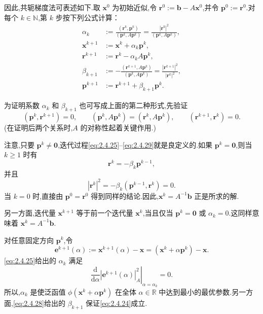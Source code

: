 因此,共轭梯度法可表述如下.取 \(\boldsymbol{x}^0\) 为初始近似,令 \(\boldsymbol{r}^0:=\boldsymbol{b}-A\boldsymbol{x}^0\),并令 \(\boldsymbol{p}^0:=\boldsymbol{r}^0\).对每个 \(k\in\mathbb N\),第 \(k\) 步按下列公式计算：
\begin{align}
  \alpha_k&:=\frac{(\boldsymbol{r}^k,\boldsymbol{p}^k)}{(\boldsymbol{p}^k,A\boldsymbol{p}^k)}
             =\frac{|\boldsymbol{r}^k|^2}{(\boldsymbol{p}^k,A\boldsymbol{p}^k)},\label{eq:2.4.25}\\
  \boldsymbol{x}^{k+1}&:=\boldsymbol{x}^k+\alpha_k\boldsymbol{p}^k,\label{eq:2.4.26}\\
  \boldsymbol{r}^{k+1}&:=\boldsymbol{r}^k-\alpha_kA\boldsymbol{p}^k,\label{eq:2.4.27}\\
  \beta_{k+1}&:=-\frac{(\boldsymbol{r}^{k+1},A\boldsymbol{p}^k)}{(\boldsymbol{p}^k,A\boldsymbol{p}^k)}
               =\frac{|\boldsymbol{r}^{k+1}|^2}{|\boldsymbol{r}^k|^2},\label{eq:2.4.28}\\
  \boldsymbol{p}^{k+1}&:=\boldsymbol{r}^{k+1}+\beta_{k+1}\boldsymbol{p}^k.\label{eq:2.4.29}
\end{align}

为证明系数 \(\alpha_k\) 和 \(\beta_{k+1}\) 也可写成上面的第二种形式,先验证
\begin{equation}\label{eq:2.4.30}
  (\boldsymbol{p}^k,\boldsymbol{r}^{k+1})=0,\qquad
  (\boldsymbol{p}^k,A\boldsymbol{p}^k)=(\boldsymbol{r}^k,A\boldsymbol{p}^k),\qquad
  (\boldsymbol{r}^{k+1},\boldsymbol{r}^k)=0.
\end{equation}
(在证明后两个关系时,\(A\) 的对称性起着关键作用.)

注意,只要 \(\boldsymbol{p}^k\ne\boldsymbol{0}\),迭代过程\eqref{eq:2.4.25}–\eqref{eq:2.4.29}就是良定义的.如果 \(\boldsymbol{p}^k=\boldsymbol{0}\),则当 \(k\ge1\) 时有
\[
  \boldsymbol{r}^k=-\beta_k\boldsymbol{p}^{k-1},
\]
并且
\[
  |\boldsymbol{r}^k|^2=-\beta_k(\boldsymbol{p}^{k-1},\boldsymbol{r}^k)=0.
\]
当 \(k=0\) 时,直接由 \(\boldsymbol{p}^0=\boldsymbol{r}^0\) 得到同样的结论.因此,\(\boldsymbol{x}^k=A^{-1}\boldsymbol{b}\) 正是所求的解.

另一方面,迭代量 \(\boldsymbol{x}^{k+1}\) 等于前一个迭代量 \(\boldsymbol{x}^k\),当且仅当 \(\boldsymbol{p}^k=\boldsymbol{0}\) 或 \(\alpha_k=0\).这同样意味着 \(\boldsymbol{x}^k=A^{-1}\boldsymbol{b}\).

对任意固定方向 \(\boldsymbol{p}^k\),令
\[
  \boldsymbol{e}^{k+1}(\alpha):=\boldsymbol{x}^{k+1}(\alpha)-\boldsymbol{x}
    =(\boldsymbol{x}^k+\alpha\boldsymbol{p}^k)-\boldsymbol{x}.
\]
\eqref{eq:2.4.25}给出的 \(\alpha_k\) 满足
\begin{equation}\label{eq:2.4.31}
  \left.\frac{\mathrm d}{\mathrm d\alpha}|\boldsymbol{e}^{k+1}(\alpha)|_A^2\right|_{\alpha=\alpha_k}=0.
\end{equation}
所以,\(\alpha_k\) 是使泛函值 \(\phi(\boldsymbol{x}^k+\alpha\boldsymbol{p}^k)\) 在全体 \(\alpha\in\mathbb R\) 中达到最小的最优参数.另一方面,\eqref{eq:2.4.28}给出的 \(\beta_{k+1}\) 保证\eqref{eq:2.4.24}成立.

